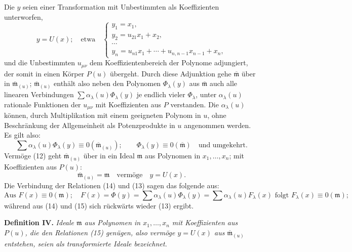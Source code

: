 \documentclass[11pt]{article}
\newcommand{\mideal}{\mathfrak m}
\newcommand{\zero}[1]{\equiv 0(#1)}
\begin{document}
Die $y$ seien einer Transformation mit Unbestimmten als Koeffizienten unterworfen,
\begin{equation}
 y=U(x);\quad \text{etwa}\quad
 \begin{cases}
 y_1=x_1,\\
 y_2=u_{21}x_1+x_2,\\
 \cdots\\
 y_n=u_{n1}x_1+\cdots+u_{n,n-1}x_{n-1}+x_n,
 \end{cases}
\tag{12}
\end{equation}
und die Unbestimmten $u_{\mu\nu}$ dem Koeffizientenbereich der Polynome adjungiert, der somit in einen Körper $P(u)$ übergeht. Durch diese Adjunktion gehe $\overline{\mideal}$ über in $\overline{\mideal}_{(u)}$; $\overline{\mideal}_{(u)}$ enthält also neben den Polynomen $\Phi_\lambda(y)$ aus $\overline{\mideal}$ auch alle linearen Verbindungen $\sum \alpha_\lambda(u)\Phi_\lambda(y)$ je endlich vieler $\Phi_\lambda$, unter $\alpha_\lambda(u)$ rationale Funktionen der $u_{\mu\nu}$ mit Koeffizienten aus $P$ verstanden. Die $\alpha_\lambda(u)$ können, durch Multiplikation mit einem geeigneten Polynom in $u$, ohne Beschränkung der Allgemeinheit als Potenzprodukte in $u$ angenommen werden. Es gilt also:
\begin{equation}
 \sum \alpha_\lambda(u)\Phi_\lambda(y)\zero{\overline{\mideal}_{(u)}};
 \qquad
 \Phi_\lambda(y)\zero{\overline{\mideal}}\quad\text{und umgekehrt}.
\tag{13}
\end{equation}
Vermöge (12) geht $\overline{\mideal}_{(u)}$ über in ein Ideal $\mideal$ aus Polynomen in $x_1,\ldots,x_n$; mit Koeffizienten aus $P(u)$:
\begin{equation}
 \overline{\mideal}_{(u)}=\mideal\quad \text{vermöge}\quad y=U(x).
\tag{14}
\end{equation}
Die Verbindung der Relationen (14) und (13) sagen das folgende aus:
\begin{equation}
 \text{Aus } F(x)\zero{\mideal};\quad
 F(x)=\Phi(y)=\sum \alpha_\lambda(u)\Phi_\lambda(y)=\sum \alpha_\lambda(u)F_\lambda(x)
 \text{ folgt } F_\lambda(x)\zero{\mideal};
\tag{15}
\end{equation}
während aus (14) und (15) sich rückwärts wieder (13) ergibt.

\medskip
\noindent\textbf{Definition IV.} \emph{Ideale $\mideal$ aus Polynomen in $x_1,\ldots,x_n$ mit Koeffizienten aus $P(u)$, die den Relationen (15) genügen, also vermöge $y=U(x)$ aus $\overline{\mideal}_{(u)}$ entstehen, seien als transformierte Ideale bezeichnet.}
\end{document}
